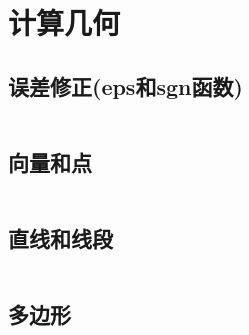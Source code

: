 \documentclass[utf8]{ctexart}
\newcommand{\cpp}[1]{\inputminted[linenos,breaklines,tabsize=4,mathescape]{c++}{#1}}
\begin{document}
\cpp{codes/math/polynomial/lagrange-weight.cpp}







\section{计算几何}

\subsection[误差修正]{误差修正(eps和sgn函数)}
\cpp{codes/computational-geometry/sgn.cpp}

\subsection{向量和点}
\cpp{codes/computational-geometry/vec.cpp}

\subsection{直线和线段}
\cpp{codes/computational-geometry/line.cpp}

\subsection{多边形}
\cpp{codes/computational-geometry/polygon.cpp}
\end{document}

